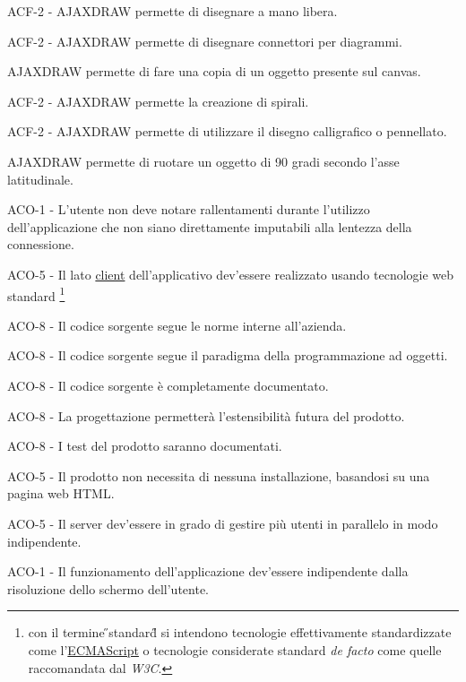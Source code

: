 \begin{elenconumerato}{\subsubsecindent}
\item{ACF-2 - AJAXDRAW permette di disegnare a mano libera.}
\item{ACF-2 - AJAXDRAW permette di disegnare connettori per diagrammi.}
\item{ AJAXDRAW permette di fare una copia di un oggetto presente sul canvas.}
\end{elenconumerato}

\begin{elenconumerato}{\subsubsecindent}
\item{ACF-2 - AJAXDRAW permette la creazione di spirali.}
\item{ACF-2 - AJAXDRAW permette di utilizzare il disegno calligrafico o pennellato.}
\item{ AJAXDRAW permette di ruotare un oggetto di 90 gradi secondo l'asse latitudinale.}
\end{elenconumerato}

\begin{elenconumerato}{\subsubsecindent}
\item ACO-1 - L'utente non deve notare rallentamenti durante l'utilizzo dell'applicazione che non siano direttamente imputabili alla lentezza della connessione.
\end{elenconumerato}

\begin{elenconumerato}{\subsubsecindent}
\item ACO-5 - Il lato {\underline{client}} dell'applicativo dev'essere realizzato usando tecnologie web standard
\footnote{con il termine \H{}standard\H{} si intendono tecnologie effettivamente standardizzate come l'\underline{ECMAScript} o tecnologie considerate standard \textit{de facto} come quelle raccomandata dal \textit{W3C}.}
\item ACO-8 - Il codice sorgente segue le norme interne all'azienda.
\item ACO-8 - Il codice sorgente segue il paradigma della programmazione ad oggetti.
\item ACO-8 - Il codice sorgente \`e completamente documentato.
\item ACO-8 - La progettazione permetter\`a l'estensibilit\`a futura del prodotto.
\item ACO-8 - I test del prodotto saranno documentati.
\item ACO-5 - Il prodotto non necessita di nessuna installazione, basandosi su una pagina web HTML.
\item ACO-5 - Il server dev'essere in grado di gestire pi\`u utenti in parallelo in modo indipendente.
\item ACO-1 - Il funzionamento dell'applicazione dev'essere indipendente dalla risoluzione dello schermo dell'utente.
\end{elenconumerato}


